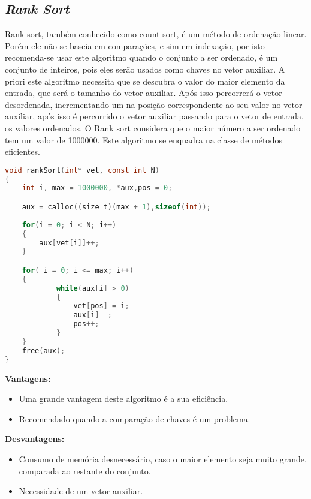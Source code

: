 \documentclass[
	12pt,				%
	oneside,			%
	a4paper,			%
	english,			%
	brazil,				%
	]{article}
\begin{document}
\subsection{\textit{Rank Sort}}
Rank sort, também conhecido como count sort, é um método de ordenação linear. Porém ele não se baseia em comparações, e sim em indexação, por isto recomenda-se
usar este algoritmo quando o conjunto a ser ordenado, é um conjunto de inteiros, pois eles serão usados como chaves no vetor auxiliar. A priori este algoritmo 
necessita que se descubra o valor do maior elemento da entrada, que será o tamanho do vetor auxiliar. Após isso percorrerá o vetor desordenada, incrementando um 
na posição correspondente ao seu valor no vetor auxiliar, após isso é percorrido o vetor auxiliar passando para o vetor de entrada, os valores ordenados. O Rank sort considera 
que o maior número a ser ordenado tem um valor de 1000000. Este algoritmo se enquadra na classe de métodos eficientes.\\ \cite{Rank} 
\begin{lstlisting}[language=C, caption=Estrutura \textit{Rank}]
void rankSort(int* vet, const int N)
{
	int i, max = 1000000, *aux,pos = 0;

	aux = calloc((size_t)(max + 1),sizeof(int));
	
	for(i = 0; i < N; i++)
	{
		aux[vet[i]]++; 
	}

	for( i = 0; i <= max; i++)
	{
			while(aux[i] > 0)
			{	
				vet[pos] = i;
				aux[i]--;
				pos++;
			}
	}
	free(aux);
}
\end{lstlisting}
\textbf{Vantagens:}
\begin{itemize}
 \item Uma grande vantagem deste algoritmo é a sua eficiência.
 \item Recomendado quando a comparação de chaves é um problema.
\end{itemize}
\textbf{Desvantagens:}
\begin{itemize}
 \item Consumo de memória desnecessário, caso o maior elemento seja muito grande, comparada ao restante do conjunto.
 \item Necessidade de um vetor auxiliar.
\end{itemize}
\end{document}
